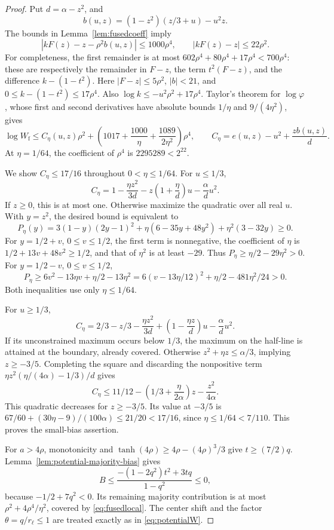 \begin{proof}
Put \(d=\alpha-z^2\), and
\[
 b(u,z)=(1-z^2)(z/3+u)-u^2z.
\]
The bounds in Lemma~\ref{lem:fusedcoeff} imply
\[
 |kF(z)-z-\rho^2b(u,z)|\le1000\rho^4,
 \qquad |kF(z)-z|\le22\rho^2.
\]
For completeness, the first remainder is at most
\(602\rho^4+80\rho^4+17\rho^4<700\rho^4\):
these are respectively the remainder in \(F-z\), the term
\(t^2(F-z)\), and the difference \(k-(1-t^2)\).
Here \(|F-z|\le5\rho^2\), \(|b|<21\), and
\(0\le k-(1-t^2)\le17\rho^4\).
Also \(\log k\le-u^2\rho^2+17\rho^4\).
Taylor's theorem for \(\log\varphi\), whose first and second
derivatives have absolute bounds \(1/\eta\) and
\(9/(4\eta^2)\), gives
\[
 \log W_{\mathrm f}
 \le C_\eta(u,z)\rho^2+
 \left(1017+\frac{1000}\eta+
                   \frac{1089}{2\eta^2}\right)\rho^4,
 \qquad
 C_\eta=e(u,z)-u^2+\frac{zb(u,z)}d.
\]
At \(\eta=1/64\), the coefficient of \(\rho^4\) is
\(2295289<2^{22}\).

We show \(C_\eta\le17/16\) throughout \(0<\eta\le1/64\).
For \(u\le1/3\),
\[
 C_\eta=1-\frac{\eta z^2}{3d}
       -z\left(1+\frac\eta d\right)u-\frac\alpha d u^2.
\]
If \(z\ge0\), this is at most one.  Otherwise maximize the
quadratic over all real \(u\).  With \(y=z^2\), the desired
bound is equivalent to
\[
 P_\eta(y)=3(1-y)(2y-1)^2
       +\eta(6-35y+48y^2)+\eta^2(3-32y)\ge0.
\]
For \(y=1/2+v\), \(0\le v\le1/2\), the first term is
nonnegative, the coefficient of \(\eta\) is
\(1/2+13v+48v^2\ge1/2\), and that of \(\eta^2\) is at
least \(-29\).  Thus \(P_\eta\ge\eta/2-29\eta^2>0\).
For \(y=1/2-v\), \(0\le v\le1/2\),
\[
 P_\eta\ge6v^2-13\eta v+\eta/2-13\eta^2
 =6(v-13\eta/12)^2+\eta/2-481\eta^2/24>0.
\]
Both inequalities use only \(\eta\le1/64\).

For \(u\ge1/3\),
\[
 C_\eta=2/3-z/3-\frac{\eta z^2}{3d}
       +\left(1-\frac{\eta z}d\right)u-\frac\alpha d u^2.
\]
If its unconstrained maximum occurs below \(1/3\), the maximum
on the half-line is attained at the boundary, already covered.
Otherwise \(z^2+\eta z\le\alpha/3\), implying \(z\ge-3/5\).
Completing the square and discarding the nonpositive term
\(\eta z^2(\eta/(4\alpha)-1/3)/d\) gives
\[
 C_\eta\le11/12-
      \left(1/3+\frac\eta{2\alpha}\right)z-
      \frac{z^2}{4\alpha}.
\]
This quadratic decreases for \(z\ge-3/5\).  Its value at
\(-3/5\) is
\(67/60+(30\eta-9)/(100\alpha)\le21/20<17/16\), since
\(\eta\le1/64<7/110\).  This proves the small-bias assertion.

For \(a>4\rho\), monotonicity and
\(\tanh(4\rho)\ge4\rho-(4\rho)^3/3\) give
\(t\ge(7/2)q\).  Lemma~\ref{lem:potential-majority-bias} gives
\[
 B\le\frac{-(1-2q^2)t^2+3tq}{1-q^2}\le0,
\]
because \(-1/2+7q^2<0\).  Its remaining majority contribution
is at most \(\rho^2+4\rho^4/\eta^2\), covered by
\eqref{eq:fusedlocal}.  The center shift and the factor
\(\theta=q/r_\ell\le1\) are treated exactly as in
\eqref{eq:potentialW}.
\end{proof}

